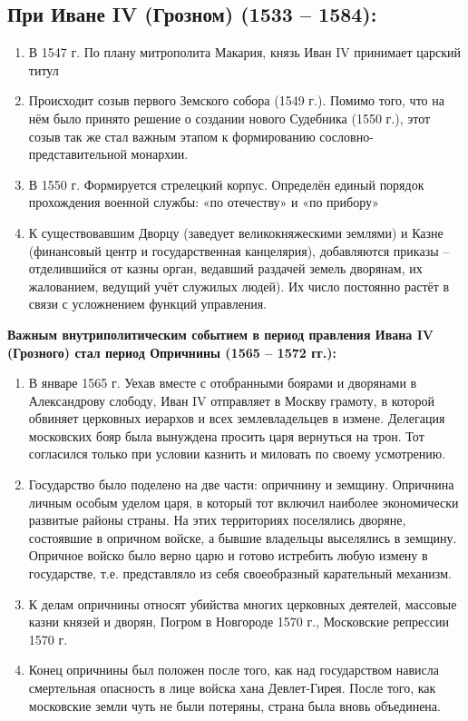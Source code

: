 \subsection{При Иване IV (Грозном) (1533 – 1584):}

\begin{enumerate}
    \item{ В 1547 г. По плану митрополита Макария, князь Иван IV принимает царский титул}
    \item{ Происходит созыв первого Земского собора (1549 г.). Помимо того, что на нём было принято решение о создании нового Судебника (1550 г.), этот созыв так же стал важным этапом к формированию сословно-представительной монархии.}
    \item{ В 1550 г. Формируется стрелецкий корпус. Определён единый порядок прохождения военной службы: «по отечеству» и «по прибору»}
    \item{  К существовавшим Дворцу (заведует великокняжескими землями) и Казне (финансовый центр и государственная канцелярия), добавляются приказы – отделившийся от казны орган, ведавший раздачей земель дворянам, их жалованием, ведущий учёт служилых людей). Их число постоянно растёт в связи с усложнением функций управления.}
\end{enumerate}

\textbf{Важным внутриполитическим событием в период правления Ивана IV (Грозного) стал период Опричнины (1565 – 1572 гг.):}

\begin{enumerate}
    \item{ В январе 1565 г. Уехав вместе с отобранными боярами и дворянами в Александрову слободу, Иван IV отправляет в Москву грамоту, в которой обвиняет церковных иерархов и всех землевладельцев в измене. Делегация московских бояр была вынуждена просить царя вернуться на трон. Тот согласился только при условии казнить и миловать по своему усмотрению. }
    \item{ Государство было поделено на две части: опричнину и земщину. Опричнина личным особым уделом царя, в который тот включил наиболее экономически развитые районы страны. На этих территориях поселялись дворяне, состоявшие в опричном войске, а бывшие владельцы выселялись в земщину. Опричное войско было верно царю и готово истребить любую измену в государстве, т.е. представляло из себя своеобразный карательный механизм.}
    \item{ К делам опричнины относят убийства многих церковных деятелей, массовые казни князей и дворян, Погром в Новгороде 1570 г., Московские репрессии 1570 г.}
    \item{ Конец опричнины был положен после того, как над государством нависла смертельная опасность в лице войска хана Девлет-Гирея. После того, как московские земли чуть не были потеряны, страна была вновь объединена.}
\end{enumerate}

